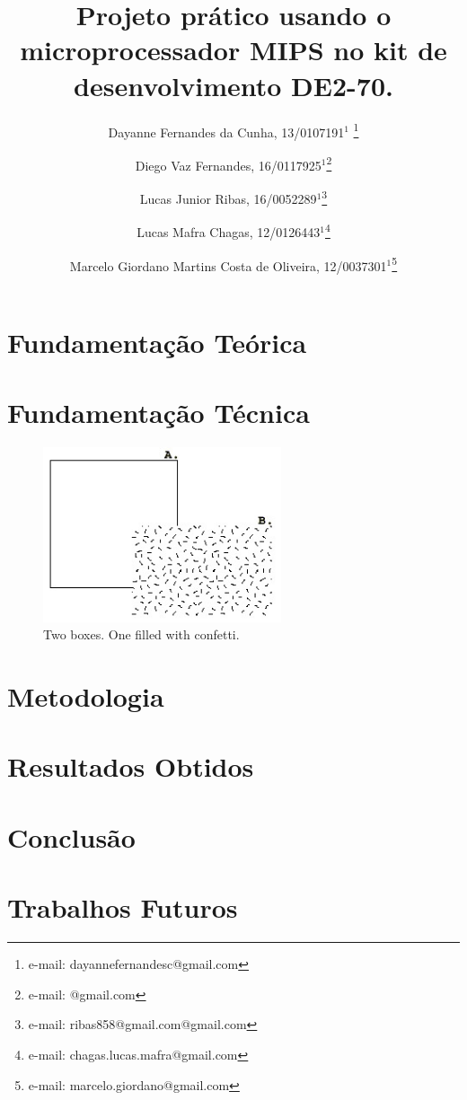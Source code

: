\documentclass{vgtc}                          %
\title{Projeto prático usando o microprocessador MIPS no kit de desenvolvimento DE2-70.}
\author{Dayanne Fernandes da Cunha, 13/0107191$^{1}$ \thanks{e-mail: dayannefernandesc@gmail.com}%
\and Diego Vaz Fernandes, 16/0117925$^{1}$\thanks{e-mail: @gmail.com}%
\and Lucas Junior Ribas, 16/0052289$^{1}$\thanks{e-mail: ribas858@gmail.com@gmail.com}
\and Lucas Mafra Chagas, 12/0126443$^{1}$\thanks{e-mail: chagas.lucas.mafra@gmail.com}
\and Marcelo Giordano Martins Costa de Oliveira, 12/0037301$^{1}$\thanks{e-mail: marcelo.giordano@gmail.com}}
\affiliation{\scriptsize $^{1}$Universidade de Brasília, Departamento de Ciência da Computação, Brasil}
\begin{document}




\maketitle



\section{Fundamentação Teórica}


\section{Fundamentação Técnica}


\begin{figure}[htb]
  \centering
  \includegraphics[width=2.76in]{figure.jpg}
  \caption{Two boxes. One filled with confetti.}
\end{figure}

\section{Metodologia}


\section{Resultados Obtidos}



\section{Conclusão}


\section{Trabalhos Futuros}



\end{document}
